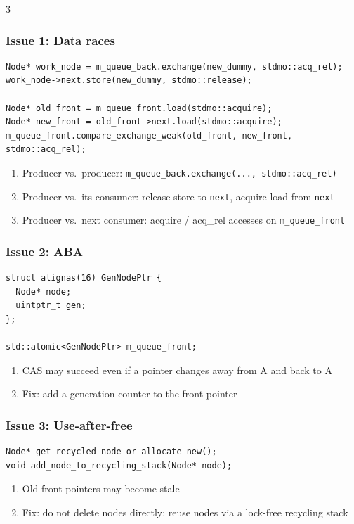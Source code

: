 \documentclass[12pt, a4paper]{article}
\begin{document}
\begin{multicols*}{3}
\subsubsection{Issue 1: Data races}
\begin{lstlisting}[basicstyle=\ttfamily\scriptsize]
Node* work_node = m_queue_back.exchange(new_dummy, stdmo::acq_rel);
work_node->next.store(new_dummy, stdmo::release);

Node* old_front = m_queue_front.load(stdmo::acquire);
Node* new_front = old_front->next.load(stdmo::acquire);
m_queue_front.compare_exchange_weak(old_front, new_front, stdmo::acq_rel);
\end{lstlisting}
\begin{enumerate}[$\bullet$]
  \item Producer vs.\ producer: \lstinline|m_queue_back.exchange(..., stdmo::acq_rel)|
  \item Producer vs.\ its consumer: release store to \lstinline|next|, acquire load from \lstinline|next|
  \item Producer vs.\ next consumer: acquire / acq\_rel accesses on \lstinline|m_queue_front|
\end{enumerate}

\colbreak
\subsubsection{Issue 2: ABA}
\begin{lstlisting}[basicstyle=\ttfamily\scriptsize]
struct alignas(16) GenNodePtr {
  Node* node;
  uintptr_t gen;
};

std::atomic<GenNodePtr> m_queue_front;
\end{lstlisting}\vspace{-1em}
\begin{enumerate}[$\bullet$]
  \item CAS may succeed even if a pointer changes away from A and back to A
  \item Fix: add a generation counter to the front pointer
\end{enumerate}

\subsubsection{Issue 3: Use-after-free}
\begin{lstlisting}[basicstyle=\ttfamily\scriptsize]
Node* get_recycled_node_or_allocate_new();
void add_node_to_recycling_stack(Node* node);
\end{lstlisting}
\begin{enumerate}[$\bullet$]
  \item Old front pointers may become stale
  \item Fix: do not delete nodes directly; reuse nodes via a lock-free recycling stack
\end{enumerate}


\end{multicols*}
\end{document}
